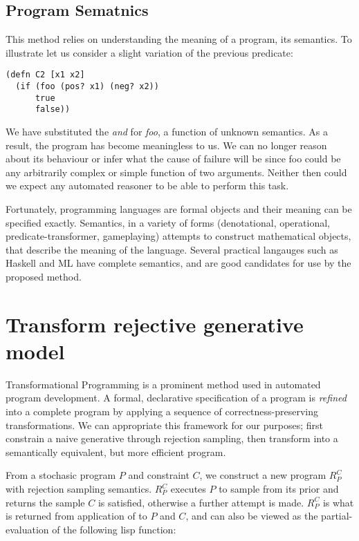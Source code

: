 \subsection{Program Sematnics}
This method relies on understanding the meaning of a program, its semantics.
To illustrate let us consider a slight variation of the previous predicate:

\begin{verbatim}
(defn C2 [x1 x2]
  (if (foo (pos? x1) (neg? x2)) 
      true                        
      false))
\end{verbatim}

We have substituted the \textit{and} for \textit{foo}, a function of unknown semantics.
As a result, the program has become meaningless to us.
We can no longer reason about its behaviour or infer what the cause of failure will be since foo could be any arbitrarily complex or simple function of two arguments.
Neither then could we expect any automated reasoner to be able to perform this task.

Fortunately, programming languages are formal objects and their meaning can be specified exactly.
Semantics, in a variety of forms (denotational, operational, predicate-transformer, gameplaying) attempts to construct mathematical objects, that describe the meaning of the language.
Several practical langauges such as Haskell and ML have complete semantics, and are good candidates for use by the proposed method.

\section{Transform rejective generative model}
Transformational Programming is a prominent method used in automated program development.
A formal, declarative specification of a program is {\em refined} into a complete program by applying a sequence of correctness-preserving transformations.
We can appropriate this framework for our purposes; first constrain a naive generative through rejection sampling, then transform into a semantically equivalent, but more efficient program.

From a stochasic program $P$ and constraint $C$, we construct a new program $R_P^C$ with rejection sampling semantics.
$R_P^C$ executes $P$ to sample from its prior and returns the sample $C$ is satisfied, otherwise a further attempt is made.
$R_P^C$ is what is returned from application of  to $P$ and $C$, and can also be viewed as the partial-evaluation of the following lisp function:

